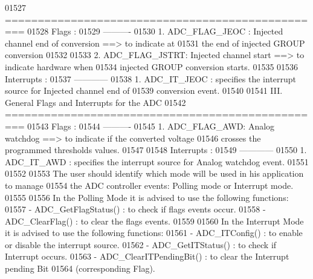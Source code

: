 \begin{DoxyCode}
01527 \textcolor{comment}{  =================================================}
01528 \textcolor{comment}{  Flags :}
01529 \textcolor{comment}{  ---------- }
01530 \textcolor{comment}{     1. ADC\_FLAG\_JEOC : Injected channel end of conversion ==> to indicate at }
01531 \textcolor{comment}{               the end of injected GROUP conversion  }
01532 \textcolor{comment}{              }
01533 \textcolor{comment}{     2. ADC\_FLAG\_JSTRT: Injected channel start ==> to indicate hardware when }
01534 \textcolor{comment}{               injected GROUP conversion starts.}
01535 \textcolor{comment}{}
01536 \textcolor{comment}{  Interrupts :}
01537 \textcolor{comment}{  ------------}
01538 \textcolor{comment}{     1. ADC\_IT\_JEOC : specifies the interrupt source for Injected channel end of }
01539 \textcolor{comment}{                      conversion event.     }
01540 \textcolor{comment}{}
01541 \textcolor{comment}{  III. General Flags and Interrupts for the ADC}
01542 \textcolor{comment}{  ================================================= }
01543 \textcolor{comment}{  Flags :}
01544 \textcolor{comment}{  ---------- }
01545 \textcolor{comment}{     1. ADC\_FLAG\_AWD: Analog watchdog ==> to indicate if the converted voltage }
01546 \textcolor{comment}{              crosses the programmed thresholds values.}
01547 \textcolor{comment}{              }
01548 \textcolor{comment}{  Interrupts :}
01549 \textcolor{comment}{  ------------}
01550 \textcolor{comment}{     1. ADC\_IT\_AWD : specifies the interrupt source for Analog watchdog event. }
01551 \textcolor{comment}{}
01552 \textcolor{comment}{  }
01553 \textcolor{comment}{  The user should identify which mode will be used in his application to manage }
01554 \textcolor{comment}{  the ADC controller events: Polling mode or Interrupt mode.}
01555 \textcolor{comment}{  }
01556 \textcolor{comment}{  In the Polling Mode it is advised to use the following functions:}
01557 \textcolor{comment}{      - ADC\_GetFlagStatus() : to check if flags events occur. }
01558 \textcolor{comment}{      - ADC\_ClearFlag()     : to clear the flags events.}
01559 \textcolor{comment}{      }
01560 \textcolor{comment}{  In the Interrupt Mode it is advised to use the following functions:}
01561 \textcolor{comment}{     - ADC\_ITConfig()          : to enable or disable the interrupt source.}
01562 \textcolor{comment}{     - ADC\_GetITStatus()       : to check if Interrupt occurs.}
01563 \textcolor{comment}{     - ADC\_ClearITPendingBit() : to clear the Interrupt pending Bit }
01564 \textcolor{comment}{                                 (corresponding Flag). }

\end{DoxyCode}
